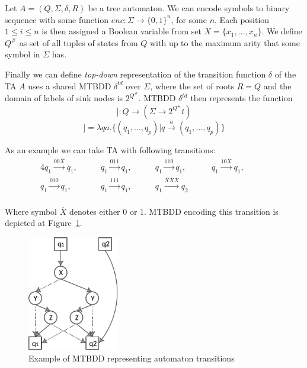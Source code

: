 \documentclass[a4paper, 12pt]{article}
\begin{document}
Let $A=(Q, \Sigma, \delta, R)$ be a tree automaton. We can encode symbols to binary sequence with some function $enc: \Sigma \rightarrow \{0, 1\}^n$, for some $n$. Each position $1\leq i \leq n$ is then assigned a Boolean variable from set $X = \{x_1, \dots, x_n\}$. We define $Q^\#$ as set of all tuples of states from $Q$ with up to the maximum arity that some symbol in $\Sigma$ has.

Finally we can define \textit{top-down} representation of the transition function $\delta$ of the TA $A$ uses a shared MTBDD $\delta^{td}$ over $\Sigma$, where the set of roots $R=Q$ and the domain of labels of sink nodes is $2^{Q^\#}$. MTBDD $\delta^{td}$ then represents the function
\begin{equation*}
[[ \delta^{td}]]  : Q \rightarrow (\Sigma \rightarrow 2^{Q^\#}t)
\end{equation*}
\begin{equation*}
[[ \delta^{td}]]   = \lambda q a . \{(q_1, \dots, q_p) | q \xrightarrow{a} (q_1, \dots, q_p) \} 
\end{equation*}

As an example we can take TA with following transitions:
\begin{alignat*}{4}
q_1 \xrightarrow{00\overline{X}} q_1, \qquad &
q_1 \xrightarrow{011} q_1, \qquad & 
q_1 \xrightarrow{110} q_1, \qquad &
q_1 \xrightarrow{10\overline{X}} q_1, \qquad & \\
q_1 \xrightarrow{010} q_1, \qquad &
q_1 \xrightarrow{111} q_1, \qquad &
q_1 \xrightarrow{\overline{X}\overline{X}\overline{X}} q_2 \qquad &  &\\
\end{alignat*}

Where symbol $\overline{X}$ denotes either 0 or 1. MTBDD encoding this transition is depicted at Figure~\ref{fig:MTBDD}.

\begin{figure}[h]
\centering
\includegraphics[width=4cm]{MTBDD}
\caption{Example of MTBDD representing automaton transitions}
\label{fig:MTBDD}
\end{figure}
\end{document}
